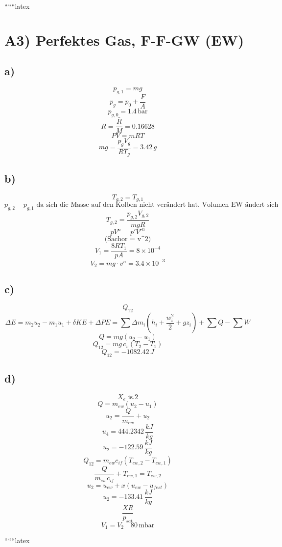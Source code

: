 
``````latex


\section*{A3) Perfektes Gas, F-F-GW (EW)}

\subsection*{a)}
\[
p_{g,1} = mg
\]
\[
p_g = p_0 + \frac{F}{A}
\]
\[
p_{g,0} = 1.4 \, \text{bar}
\]
\[
R = \frac{\bar{R}}{M} = 0.16628
\]
\[
PV = mRT
\]
\[
mg = \frac{p_g V_g}{R T_g} = 3.42 \, g
\]

\subsection*{b)}
\[
T_{g,2} = T_{g,1}
\]
\[
p_{g,2} - p_{g,1} \text{ da sich die Masse auf den Kolben nicht verändert hat. Volumen EW ändert sich nicht. Gas komprimiert somit höherer Druck jedoch höhere Temperatur}
\]
\[
T_{g,2} = \frac{p_{g,2} V_{g,2}}{mg R}
\]
\[
pV^n = p'V'^n
\]
\[
\text{(Sachor = v^2)}
\]
\[
V_1 = \frac{8RT_1}{pA} = 8 \times 10^{-4}
\]
\[
V_2 = mg \cdot v^n = 3.4 \times 10^{-3}
\]

\subsection*{c)}
\[
Q_{12}
\]
\[
\Delta E = m_2 u_2 - m_1 u_1 + \delta KE + \Delta PE = \sum \Delta m_i \left( h_i + \frac{w_i^2}{2} + gz_i \right) + \sum Q - \sum W
\]
\[
Q = mg (u_2 - u_1)
\]
\[
Q_{12} = mg \, c_v (T_2 - T_1)
\]
\[
Q_{12} = -1082.42 \, J
\]

\subsection*{d)}
\[
X_e \text{ is.2}
\]
\[
Q = m_{ew} (u_2 - u_1)
\]
\[
u_2 = \frac{Q}{m_{ew}} + u_2
\]
\[
u_4 = 444.2342 \, \frac{kJ}{kg}
\]
\[
u_2 = -122.59 \, \frac{kJ}{kg}
\]
\[
Q_{12} = m_{ew} c_{if} (T_{ew,2} - T_{ew,1})
\]
\[
\frac{Q}{m_{ew} c_{if}} + T_{ew,1} = T_{ew,2}
\]
\[
u_2 = u_{ew} + x \left( u_{ew} - u_{fest} \right)
\]
\[
u_2 = -133.41 \, \frac{kJ}{kg}
\]
\[
\frac{X R}{p_{sat}}
\]
\[
V_1 = V_2 \quad 80 \, \text{mbar}
\]

``````latex



